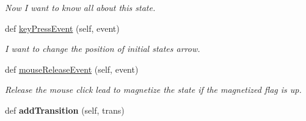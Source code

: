 \begin{DoxyCompactItemize}
\begin{DoxyCompactList}\small\item\em Now I want to know all about this state. \end{DoxyCompactList}\item 
def \mbox{\hyperlink{classState_1_1State_a3a1fbc7eb7a9c27535d972c532a17844}{key\+Press\+Event}} (self, event)
\begin{DoxyCompactList}\small\item\em I want to change the position of initial state\textquotesingle{}s arrow. \end{DoxyCompactList}\item 
def \mbox{\hyperlink{classState_1_1State_a9df53dcbf226c8ccc80ee242b63ab0ad}{mouse\+Release\+Event}} (self, event)
\begin{DoxyCompactList}\small\item\em Release the mouse click lead to magnetize the state if the magnetized flag is up. \end{DoxyCompactList}\item 
\mbox{\label{classState_1_1State_ad4f444f4b6f40d5da03adb2cc30ae12f}} 
def {\bfseries add\+Transition} (self, trans)
\end{DoxyCompactItemize}
